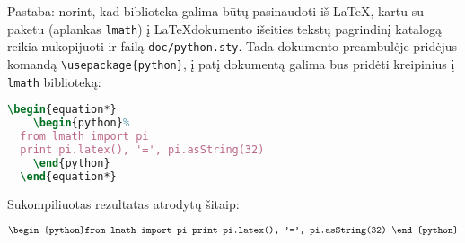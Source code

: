 Pastaba: norint, kad biblioteka galima būtų pasinaudoti iš \LaTeX, 
kartu su paketu (aplankas \verb|lmath|) į \LaTeX dokumento išeities
tekstų pagrindinį katalogą reikia nukopijuoti ir failą 
\verb|doc/python.sty|. Tada dokumento preambulėje pridėjus
komandą \verb|\usepackage{python}|, į patį dokumentą galima bus pridėti
kreipinius į \verb|lmath| biblioteką: 
\begin{lstlisting}[language=tex]
  \begin{equation*}
    \begin{python}%
  from lmath import pi
  print pi.latex(), '=', pi.asString(32)
    \end{python}
  \end{equation*}
\end{lstlisting}

Sukompiliuotas rezultatas atrodytų šitaip:

\begin{equation*}
  \begin{python}%
from lmath import pi
print pi.latex(), '=', pi.asString(32)
  \end{python}
\end{equation*}
